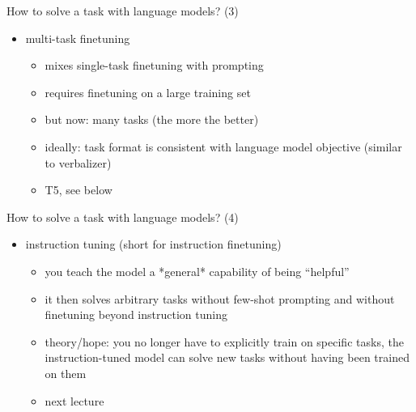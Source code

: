 \begin{frame}{How to solve a task with language models? (3)}

\vfill

\begin{itemize}
\item multi-task finetuning
        \begin{itemize}
            \item mixes single-task finetuning with prompting
        \item requires finetuning on a large training set
        \item but now: many tasks (the more the better)
        \item ideally: task format is consistent with language model
            objective (similar to verbalizer)
            \item T5, see below
        \end{itemize}
\end{itemize}

\vfill

\end{frame}

\begin{frame}{How to solve a task with language models? (4)}

\vfill

\begin{itemize}
\item instruction tuning (short for instruction finetuning)
        \begin{itemize}
            \item you teach the model a *general*
            capability of being ``helpful''
            \item it then solves arbitrary tasks without few-shot
            prompting and without finetuning beyond instruction tuning
            \item theory/hope: you no longer have to explicitly
            train on specific tasks, the instruction-tuned
            model can solve new tasks without having been
            trained on them
            \item next lecture
        \end{itemize}
\end{itemize}

\vfill

\end{frame}


